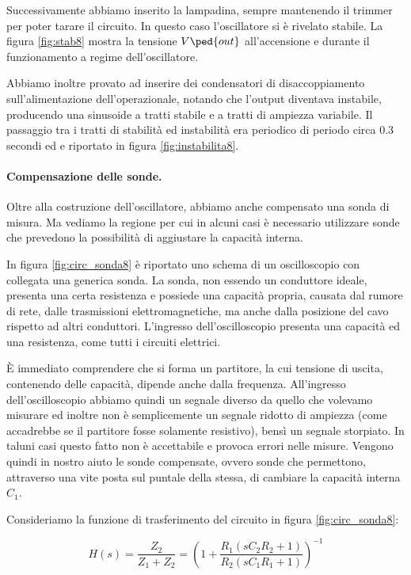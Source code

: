 Successivamente abbiamo inserito la lampadina, sempre mantenendo il trimmer per poter tarare il circuito. In questo caso l'oscillatore
si è rivelato stabile. La figura \ref{fig:stab8} mostra la tensione $V\ped{out}$ all'accensione e durante il funzionamento a regime dell'oscillatore.

Abbiamo inoltre provato ad inserire dei condensatori di disaccoppiamento sull'alimentazione dell'operazionale, notando che
l'output diventava instabile, producendo una sinusoide a tratti stabile e a tratti di ampiezza variabile.
Il passaggio tra i tratti di stabilità ed instabilità era periodico di periodo circa 0.3 secondi ed e riportato in figura \ref{fig:instabilita8}.

\paragraph{Compensazione delle sonde.}

Oltre alla costruzione dell'oscillatore, abbiamo anche compensato una sonda di misura. Ma vediamo la regione per cui
in alcuni casi è necessario utilizzare sonde che prevedono la possibilità di aggiustare la capacità interna.

In figura \ref{fig:circ_sonda8} è riportato uno schema di un oscilloscopio con collegata una generica sonda.
La sonda, non essendo un conduttore ideale, presenta una certa resistenza e possiede una capacità propria, causata
dal rumore di rete, dalle trasmissioni elettromagnetiche, ma anche dalla posizione del cavo rispetto ad altri conduttori.
L'ingresso dell'oscilloscopio presenta una capacità ed una resistenza, come tutti i circuiti elettrici.

È immediato comprendere che si forma un partitore, la cui tensione di uscita, contenendo delle capacità, dipende anche dalla
frequenza. All'ingresso dell'oscilloscopio abbiamo quindi un segnale diverso da quello che volevamo misurare ed inoltre non
è semplicemente un segnale ridotto di ampiezza (come accadrebbe se il partitore fosse solamente resistivo),
bensì un segnale storpiato. In taluni casi questo fatto non è accettabile e provoca errori nelle misure.
Vengono quindi in nostro aiuto le sonde compensate, ovvero sonde che permettono, attraverso una vite posta sul
puntale della stessa, di cambiare la capacità interna $C_1$.

Consideriamo la funzione di trasferimento del circuito in figura \ref{fig:circ_sonda8}:

\begin{equation}
    H(s) = \frac{Z_2}{Z_1 + Z_2} = \left(1 + \frac{R_1(sC_2R_2 + 1)}{R_2(sC_1R_1 + 1)}\right)^{-1}
\end{equation}

